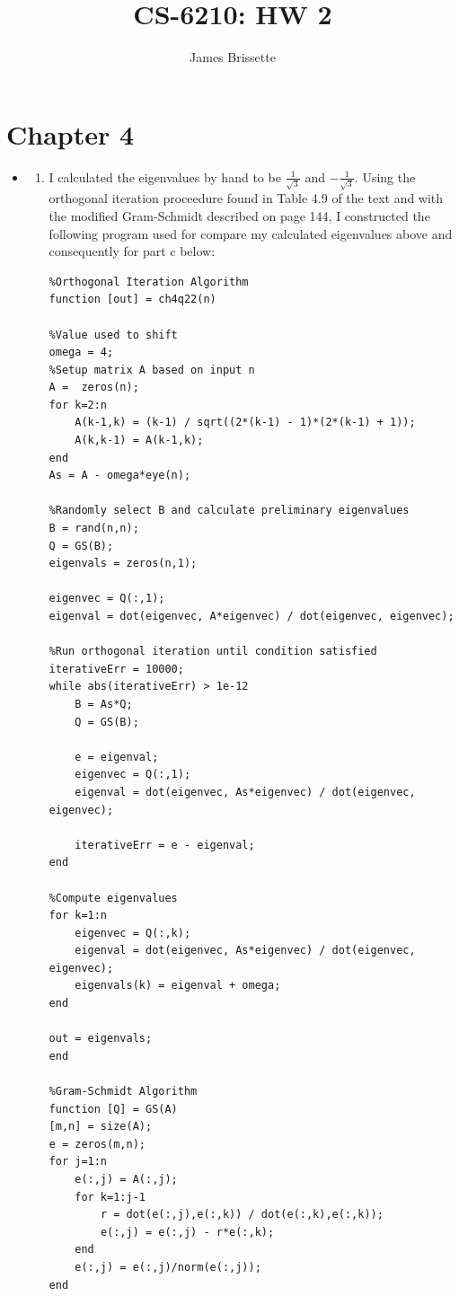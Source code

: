 \documentclass[11pt,a4paper]{article}
\author{James Brissette}
\title{CS-6210: HW 2}
\begin{document}
	\maketitle
	
	\section{Chapter 4}
		\begin{itemize}
			\item[4.22]
				\begin{enumerate} [label={\alph*)}]
					\item I calculated the eigenvalues by hand to be $\frac{1}{\sqrt{3}}$ and $-\frac{1}{\sqrt{3}}$. Using the orthogonal iteration proceedure found in Table 4.9 of the text and with the modified Gram-Schmidt described on page 144, I constructed the following program used for compare my calculated eigenvalues above and consequently for part c below:
					\begin{lstlisting} 
%Orthogonal Iteration Algorithm
function [out] = ch4q22(n)

%Value used to shift
omega = 4;
%Setup matrix A based on input n
A =  zeros(n);
for k=2:n
    A(k-1,k) = (k-1) / sqrt((2*(k-1) - 1)*(2*(k-1) + 1));
    A(k,k-1) = A(k-1,k);
end
As = A - omega*eye(n);

%Randomly select B and calculate preliminary eigenvalues
B = rand(n,n);
Q = GS(B);
eigenvals = zeros(n,1);

eigenvec = Q(:,1);
eigenval = dot(eigenvec, A*eigenvec) / dot(eigenvec, eigenvec);

%Run orthogonal iteration until condition satisfied
iterativeErr = 10000;
while abs(iterativeErr) > 1e-12
    B = As*Q;
    Q = GS(B);
    
    e = eigenval;
    eigenvec = Q(:,1);
    eigenval = dot(eigenvec, As*eigenvec) / dot(eigenvec, eigenvec);
    
    iterativeErr = e - eigenval;
end

%Compute eigenvalues
for k=1:n
    eigenvec = Q(:,k);
    eigenval = dot(eigenvec, As*eigenvec) / dot(eigenvec, eigenvec);
    eigenvals(k) = eigenval + omega;
end

out = eigenvals;
end

%Gram-Schmidt Algorithm
function [Q] = GS(A)
[m,n] = size(A);
e = zeros(m,n);
for j=1:n
    e(:,j) = A(:,j);
    for k=1:j-1
        r = dot(e(:,j),e(:,k)) / dot(e(:,k),e(:,k));
        e(:,j) = e(:,j) - r*e(:,k);
    end
    e(:,j) = e(:,j)/norm(e(:,j));
end


\end{lstlisting}
\end{enumerate}
\end{itemize}
\end{document}
